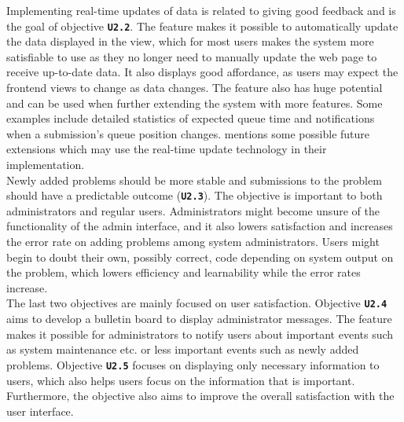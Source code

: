 Implementing real-time updates of data is related to giving good feedback and is the goal of objective \textbf{\texttt{U2.2}}. The feature makes it possible to automatically update the data displayed in the view, which for most users makes the system more satisfiable to use as they no longer need to manually update the web page to receive up-to-date data. It also displays good affordance, as users may expect the frontend views to change as data changes. The feature also has huge potential and can be used when further extending the system with more features. Some examples include detailed statistics of expected queue time and notifications when a submission's queue position changes.  mentions some possible future extensions which may use the real-time update technology in their implementation. \\

Newly added problems should be more stable and submissions to the problem should have a predictable outcome (\textbf{\texttt{U2.3}}). The objective is important to both administrators and regular users. Administrators might become unsure of the functionality of the admin interface, and it also lowers satisfaction and increases the error rate on adding problems among system administrators. Users might begin to doubt their own, possibly correct, code depending on system output on the problem, which lowers efficiency and learnability while the error rates increase. \\

The last two objectives are mainly focused on user satisfaction. Objective \textbf{\texttt{U2.4}} aims to develop a bulletin board to display administrator messages. The feature makes it possible for administrators to notify users about important events such as system maintenance etc. or less important events such as newly added problems. Objective \textbf{\texttt{U2.5}} focuses on displaying only necessary information to users, which also helps users focus on the information that is important. Furthermore, the objective also aims to improve the overall satisfaction with the user interface.
